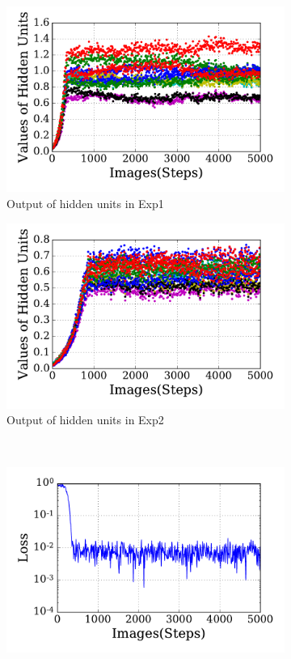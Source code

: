 \begin{figure}
\begin{subfigure}[t]{0.48\textwidth}
		\includegraphics[width=\textwidth]{pics_sdlm/31_exp_RBM_noise/exp1_hid_s.pdf}
		\caption{Output of hidden units in Exp1}
	\end{subfigure}
	\begin{subfigure}[t]{0.48\textwidth}
		\includegraphics[width=\textwidth]{pics_sdlm/31_exp_RBM_noise/exp2_hid_s.pdf}
		\caption{Output of hidden units in Exp2}
	\end{subfigure}\\
	\begin{subfigure}[t]{0.48\textwidth}
		\includegraphics[width=\textwidth]{pics_sdlm/31_exp_RBM_noise/exp1_loss_s.pdf}

\end{subfigure}
\end{figure}
